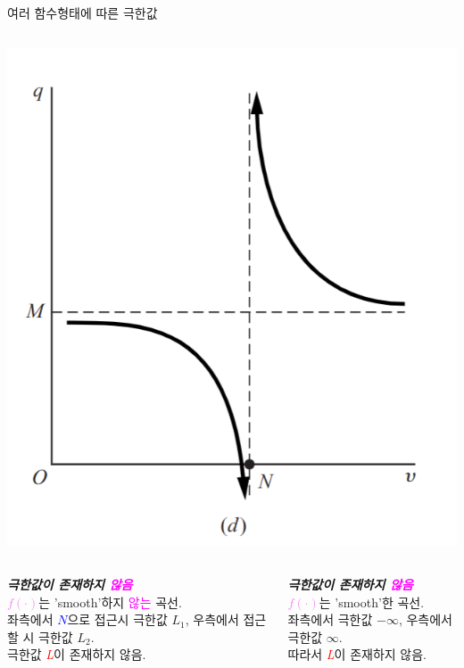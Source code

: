 \documentclass[aspectratio=169]{beamer}
\begin{document}
\begin{frame}{여러 함수형태에 따른 극한값}
\begin{columns}
\begin{column}{0.5\textwidth}
      \includegraphics[width=\linewidth,height=0.48\textheight,keepaspectratio]{../fig/limits_illustration_d.png}
    \end{column}
  \end{columns}

  \vspace{0.5em}

  \begin{columns}
    \begin{column}{0.5\textwidth}
      \footnotesize
      \textbf{\emph{극한값이 존재하지 \textcolor{magenta}{않음}}}\\
      \scriptsize \textcolor{violet}{$f(\cdot)$}는 'smooth'하지 \textcolor{magenta}{않는} 곡선.\\
      좌측에서 \textcolor{blue}{$N$}으로 접근시 극한값 $L_1$, 우측에서 접근할 시 극한값 $L_2$.\\
      극한값 \textcolor{red}{\emph{L}}이 존재하지 않음.
    \end{column}
    \begin{column}{0.5\textwidth}
      \footnotesize
      \textbf{\emph{극한값이 존재하지 \textcolor{magenta}{않음}}}\\
      \scriptsize \textcolor{violet}{$f(\cdot)$}는 'smooth'한 곡선.\\
      좌측에서 극한값 $-\infty$, 우측에서 극한값 $\infty$.\\
      따라서 \textcolor{red}{\emph{L}}이 존재하지 않음.
    \end{column}
  \end{columns}

\end{frame}
\end{document}
